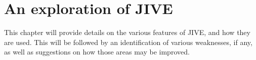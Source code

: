 \chapter{An exploration of JIVE}\label{jiveEnhance}

This chapter will provide details on the various features of JIVE,  and how they are used.
This will be followed by an identification of various weaknesses, if any, as well as suggestions on how those areas may be improved.




